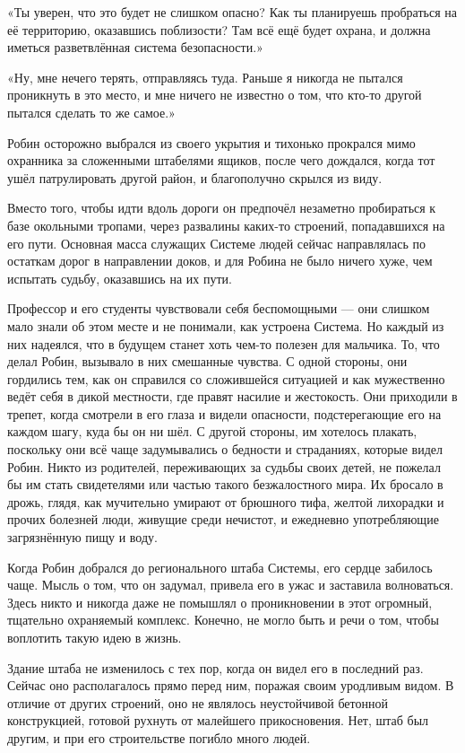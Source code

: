 \documentclass[a4paper,12pt]{book}
\begin{document}
«Ты уверен, что это будет не слишком опасно? Как ты планируешь пробраться на её территорию, оказавшись поблизости? Там всё ещё будет охрана, и должна иметься разветвлённая система безопасности.»
\par
«Ну, мне нечего терять, отправляясь туда. Раньше я никогда не пытался проникнуть в это место, и мне ничего не известно о том, что кто-то другой пытался сделать то же самое.»\\
\par
Робин осторожно выбрался из своего укрытия и тихонько прокрался мимо охранника за сложенными штабелями ящиков, после чего дождался, когда тот ушёл патрулировать другой район, и благополучно скрылся из виду.
\par
Вместо того, чтобы идти вдоль дороги он предпочёл незаметно пробираться к базе окольными тропами, через развалины каких-то строений, попадавшихся на его пути. Основная масса служащих Системе людей сейчас направлялась по остаткам дорог в направлении доков, и для Робина не было ничего хуже, чем испытать судьбу, оказавшись на их пути.
\par
Профессор и его студенты чувствовали себя беспомощными — они слишком мало знали об этом месте и не понимали, как устроена Система. Но каждый из них надеялся, что в будущем станет хоть чем-то полезен для мальчика. То, что делал Робин, вызывало в них смешанные чувства. С одной стороны, они гордились тем, как он справился со сложившейся ситуацией и как мужественно ведёт себя в дикой местности, где правят насилие и жестокость. Они приходили в трепет, когда смотрели в его глаза и видели опасности, подстерегающие его на каждом шагу, куда бы он ни шёл. С другой стороны, им хотелось плакать, поскольку они всё чаще задумывались о бедности и страданиях, которые видел Робин. Никто из родителей, переживающих за судьбы своих детей, не пожелал бы им стать свидетелями или частью такого безжалостного мира. Их бросало в дрожь, глядя, как мучительно умирают от брюшного тифа, желтой лихорадки и прочих болезней люди, живущие среди нечистот, и ежедневно употребляющие загрязнённую пищу и воду.\\
\par
Когда Робин добрался до регионального штаба Системы, его сердце забилось чаще. Мысль о том, что он задумал, привела его в ужас и заставила волноваться. Здесь никто и никогда даже не помышлял о проникновении в этот огромный, тщательно охраняемый комплекс. Конечно, не могло быть и речи о том, чтобы воплотить такую идею в жизнь.
\par
Здание штаба не изменилось с тех пор, когда он видел его в последний раз. Сейчас оно располагалось прямо перед ним, поражая своим уродливым видом. В отличие от других строений, оно не являлось неустойчивой бетонной конструкцией, готовой рухнуть от малейшего прикосновения. Нет, штаб был другим, и при его строительстве погибло много людей.
\end{document}
